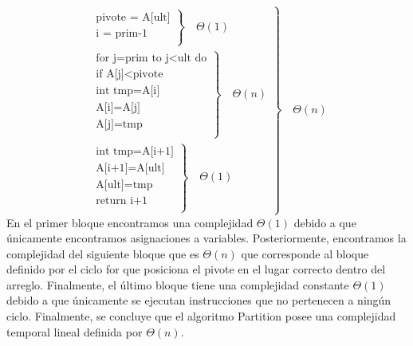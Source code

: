         \begin{equation*}
            \left.
                \begin{aligned}
                    \left.
                        \begin{aligned}
                            \text{pivote = A[ult]} \\
                            \text{i = prim-1} \\
                        \end{aligned}   
                    \right\}
                    \quad\Theta(1)
                    \\
                    \left.
                        \begin{aligned}
                            \text{for j=prim to j}<\text{ult do} \\
                            \text{if A[j]}<\text{pivote} \\
                            \text{int tmp=A[i]} \\
                            \text{A[i]=A[j]} \\
                            \text{A[j]=tmp} \\
                        \end{aligned}
                    \right\}
                    \quad\Theta(n)
                    \\
                    \left.
                        \begin{aligned}
                            \text{int tmp=A[i+1]} \\
                            \text{A[i+1]=A[ult]} \\
                            \text{A[ult]=tmp} \\
                            \text{return i+1} \\
                        \end{aligned}
                    \right\}
                    \quad\Theta(1)
                \end{aligned}
            \right\}
            \quad\Theta(n)
        \end{equation*}
        En el primer bloque encontramos una complejidad $\Theta(1)$ debido a que únicamente encontramos asignaciones a variables. Posteriormente, encontramos la complejidad del siguiente bloque que es $\Theta(n)$ que corresponde al bloque definido por el ciclo for que posiciona el pivote en el lugar correcto dentro del arreglo. Finalmente, el último bloque tiene una complejidad constante $\Theta(1)$ debido a que únicamente se ejecutan instrucciones que no pertenecen a ningún ciclo. Finalmente, se concluye que el algoritmo Partition posee una complejidad temporal lineal definida por $\Theta(n)$.
        

